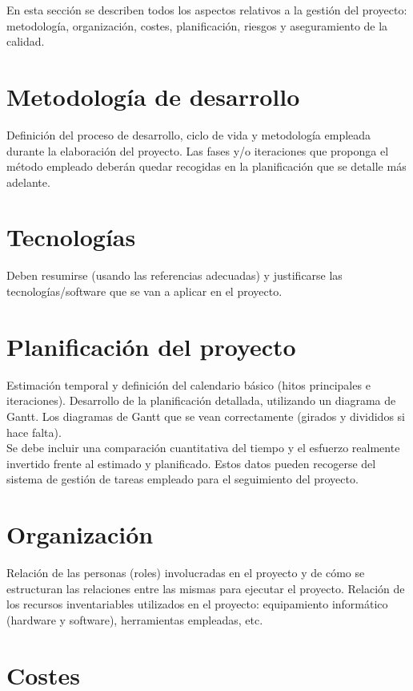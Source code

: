 En esta sección se describen todos los aspectos relativos a la gestión del proyecto: metodología, organización, costes, planificación, riesgos y aseguramiento de la calidad.

\section{Metodología de desarrollo}
Definición del proceso de desarrollo, ciclo de vida y metodología empleada durante la elaboración del proyecto. Las fases y/o iteraciones que proponga el método empleado deberán quedar recogidas en la planificación que se detalle más adelante.

\section{Tecnologías}

Deben resumirse (usando las referencias adecuadas) y justificarse las tecnologías/software que se van a aplicar en el proyecto.



\section{Planificación del proyecto}
Estimación temporal y definición del calendario básico (hitos principales e iteraciones). Desarrollo de la planificación detallada, utilizando un diagrama de Gantt. Los diagramas de Gantt que se vean correctamente (girados y divididos si hace falta).\\

Se debe incluir una comparación cuantitativa del tiempo y el esfuerzo realmente invertido frente al estimado y planificado. Estos datos pueden recogerse del sistema de gestión de tareas empleado para el seguimiento del proyecto.

\section{Organización}
Relación de las personas (roles) involucradas en el proyecto y de cómo se estructuran las relaciones entre las mismas para ejecutar el proyecto. Relación de los recursos inventariables utilizados en el proyecto: equipamiento informático (hardware y software), herramientas empleadas, etc. \\

\section{Costes}
\label{sec:costs}


